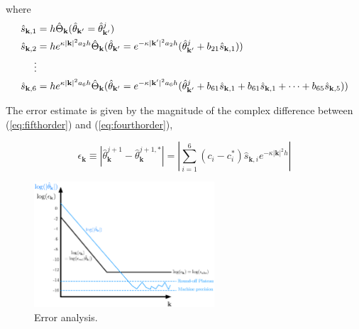 \documentclass[12pt]{article}
\begin{document}
where
\begin{subequations}
	\begin{align}
		\hat{s}_{\mathbf{k},1} & = h \hat{\Theta}_{\mathbf{k}}(\hat{\theta}_{\mathbf{k}'}=\hat{\theta}_{\mathbf{k}'}^{j}) \\
		\hat{s}_{\mathbf{k},2} & = h e^{\kappa |\mathbf{k}|^{2}a_{2}h}\hat{\Theta}_{\mathbf{k}}(\hat{\theta}_{\mathbf{k}'}=e^{-\kappa |\mathbf{k}'|^{2}a_{2}h}(\hat{\theta}_{\mathbf{k}'}^{j} + b_{21}\hat{s}_{\mathbf{k},1} ) )\\
		\notag
		\vdots \\
		\hat{s}_{\mathbf{k},6} & = h e^{\kappa |\mathbf{k}|^{2}a_{6}h}\hat{\Theta}_{\mathbf{k}}(\hat{\theta}_{\mathbf{k}'}=e^{-\kappa |\mathbf{k}'|^{2}a_{6}h}(\hat{\theta}_{\mathbf{k}'}^{j} + b_{61}\hat{s}_{\mathbf{k},1}+ b_{61}\hat{s}_{\mathbf{k},1} + \dots + b_{65}\hat{s}_{\mathbf{k},5} ) )
	\end{align}
\end{subequations}



The error estimate is given by the magnitude of the complex difference between (\ref{eq:fifthorder}) and (\ref{eq:fourthorder}),

\begin{equation}
\epsilon_{\mathbf{k}}\equiv |\hat{\theta}_{\mathbf{k}}^{j+1}-\hat{\theta}_{\mathbf{k}}^{j+1,*}| = \left|\sum_{i=1}^{6} (c_{i}-c_{i}^{*})\hat{s}_{\mathbf{k},i} e^{-\kappa |\mathbf{k}|^{2}h}\right| 
\end{equation}
\begin{figure}
	\centering
	\includegraphics[width=0.6\textwidth]{spectrum_errors.eps}
	\caption{Error analysis.}
	\label{fig:spectrum_errors}
\end{figure}
\end{document}
